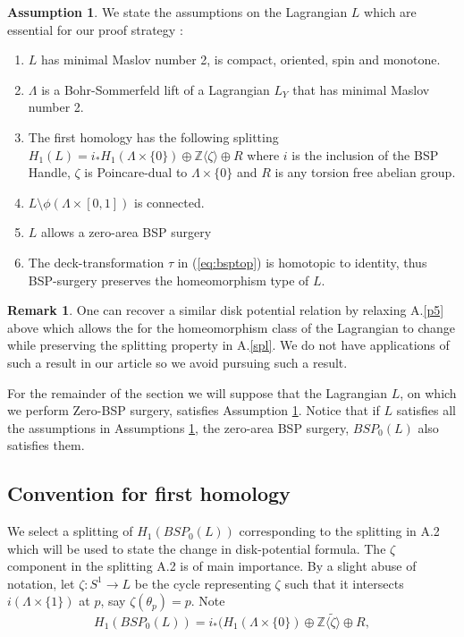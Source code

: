 \documentclass[11pt, oneside,dvipsnames]{amsart}
\renewcommand{\to}{\rightarrow}
\newcommand{\interval}{[0,1]}
\renewcommand{\to}{\rightarrow}
\newcommand{\<}{\langle}
\renewcommand{\>}{\rangle}
\newcommand{\bZ}{\mathbb{Z}}
\newcommand{\sm}{\ensuremath{\setminus}}
\renewcommand{\to}{\rightarrow}
\theoremstyle{definition}
\newtheorem{assum}[Theorem]{Assumption}
\theoremstyle{definition}
\newtheorem{remark}[Theorem]{Remark}
\numberwithin{equation}{subsection}
\begin{document}
\begin{assum}\label{ass:diskpot}
We state the assumptions on the Lagrangian $L$ which are essential for our proof strategy :
\begin{enumerate}[{A}.1]
    \item $L$ has minimal Maslov number 2, is compact, oriented, spin and monotone.
      \item \label{p3} $\Lambda$ is a Bohr-Sommerfeld lift of a Lagrangian $L_Y$ that has minimal Maslov number 2.
    \item The first homology has the following splitting $H_1(L) = i_*H_1(\Lambda \times \{0\}) \oplus \bZ\langle \zeta \rangle \oplus R$ where $i$ is the inclusion of the BSP Handle, $\zeta$ is Poincare-dual to $\Lambda\times \{ 0\}$ and $R$ is any torsion free abelian group. \label{spl}
    \item  $L\sm \phi(\Lambda \times \interval)$ is connected.
    \item $L$ allows a zero-area BSP surgery
    \item \label{p5}The deck-transformation $\tau$ in (\ref{eq:bsptop}) is homotopic to identity, thus BSP-surgery preserves the homeomorphism type of $L$.
\end{enumerate}
\end{assum}

\begin{remark}
One can recover a similar disk potential relation by relaxing  A.\ref{p5} above which allows the for the homeomorphism class of the Lagrangian to change while preserving the splitting property in A.\ref{spl}. We do not have applications of such a result in our article so we avoid pursuing such a result.
\end{remark}


\noindent For the remainder of the section we will suppose that the Lagrangian $L$, on which we perform Zero-BSP surgery, satisfies Assumption \ref{ass:diskpot}. Notice that if $L$ satisfies all the assumptions in Assumptions \ref{ass:diskpot}, the zero-area BSP surgery, $BSP_0(L)$ also satisfies them.

\subsection{Convention for first homology}
We  select a splitting of $H_1(BSP_0(L))$ corresponding to the splitting in A.2 which  will be used to state the change in disk-potential formula. The $\zeta$ component in the splitting A.2 is of main importance. By a slight abuse of notation, let $\zeta : S^1 \to L$ be the cycle representing $\zeta$ such that it intersects $i(\Lambda \times \{1 \})$ at $p$, say $\zeta (\theta_p)  =  p .$ Note
\begin{equation}\label{eq:surghom}
    H_1(BSP_0(L)) = i_*(H_1(\Lambda \times \{0\}) \oplus  \bZ\langle \widetilde\zeta \rangle  \oplus R,
    \end{equation}
\end{document}
